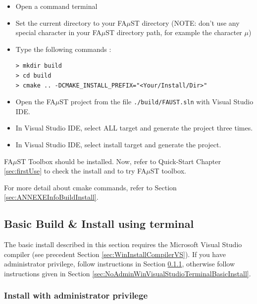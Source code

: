 \begin{itemize}

\item Open a command terminal
\item Set the current directory to your FA$\mu$ST directory (NOTE: don't use any special character in your FA$\mu$ST directory path, for example the character $\mu$)
\item Type the following commands : 
\begin{lstlisting}
> mkdir build
> cd build
> cmake .. -DCMAKE_INSTALL_PREFIX="<Your/Install/Dir>"
\end{lstlisting}
\item Open the FA$\mu$ST project from the file \texttt{./build/FAUST.sln} with Visual Studio IDE.
\item In Visual Studio IDE, select ALL target and generate the project three times.
\item In Visual Studio IDE, select install target and generate the project.
\end{itemize}

FA$\mu$ST Toolbox should be installed. Now, refer to Quick-Start Chapter \ref{sec:firstUse} to check the install and to try FA$\mu$ST toolbox.

For more detail about cmake commands, refer to Section \ref{sec:ANNEXEInfoBuildInstall}.

\subsection{Basic Build \& Install using terminal}\label{sec:WinVisualStudioTerminalBasicInstall}
The basic install described in this section requires the Microsoft Visual Studio compiler (see precedent Section \ref{sec:WinInstallCompilerVS}).
If you have administrator privilege, follow instructions in Section \ref{sec:AdminWinVisualStudioTerminalBasicInstall}, otherwise follow instructions given in Section \ref{sec:NoAdminWinVisualStudioTerminalBasicInstall}.

\subsubsection{Install with administrator privilege}
\label{sec:AdminWinVisualStudioTerminalBasicInstall}

